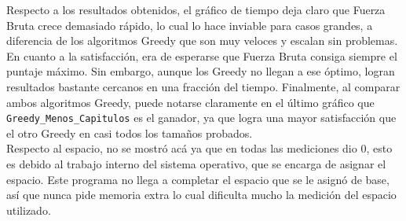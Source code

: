 





Respecto a los resultados obtenidos, el gráfico de tiempo deja claro que Fuerza Bruta crece demasiado rápido, lo cual lo hace inviable para casos grandes, a diferencia de los algoritmos Greedy que son muy veloces y escalan sin problemas. En cuanto a la satisfacción, era de esperarse que Fuerza Bruta consiga siempre el puntaje máximo. Sin embargo, aunque los Greedy no llegan a ese óptimo, logran resultados bastante cercanos en una fracción del tiempo. Finalmente, al comparar ambos algoritmos Greedy, puede notarse claramente en el último gráfico que \texttt{Greedy\_Menos\_Capitulos} es el ganador, ya que logra una mayor satisfacción que el otro Greedy en casi todos los tamaños probados.
\\
Respecto al espacio, no se mostró acá ya que en todas las mediciones dio 0, esto es debido al trabajo interno del sistema operativo, que se encarga de asignar el espacio. Este programa no llega a completar el espacio que se le asignó de base, así que nunca pide memoria extra lo cual dificulta mucho la medición del espacio utilizado.












